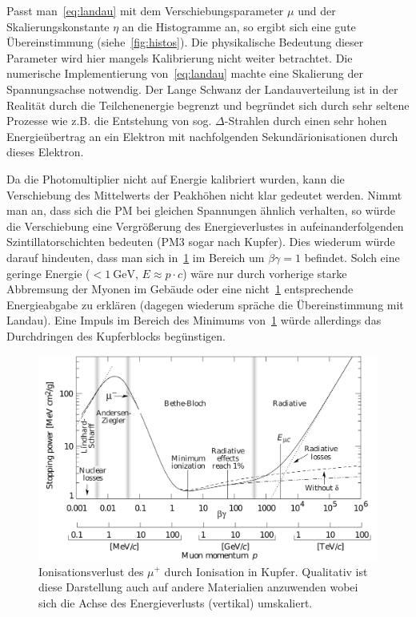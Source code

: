 \documentclass[slug=LM, room=Andreas-Schubert-Bau\,\ K\ 1A, supervisor=Anne-Sophie\ Berthold, coursedate=13.\ 12.\ 2019]{../../Lab_Report_LaTeX/lab_report}
\begin{document}
Passt man~\ref{eq:landau} mit dem Verschiebungsparameter \(\mu\) und
der Skalierungskonstante \(\eta\) an die Histogramme an, so ergibt
sich eine gute Übereinstimmung (siehe~\ref{fig:histos}). Die
physikalische Bedeutung dieser Parameter wird hier mangels
Kalibrierung nicht weiter betrachtet. Die numerische Implementierung
von~\ref{eq:landau} machte eine Skalierung der Spannungsachse
notwendig. Der Lange Schwanz der Landauverteilung ist in der
Realit\"at durch die Teilchenenergie begrenzt und begr\"undet sich
durch sehr seltene Prozesse wie z.B. die Entstehung von
sog. \(\Delta\)-Strahlen durch einen sehr hohen Energie\"ubertrag
an ein Elektron mit nachfolgenden Sekund\"arionisationen durch dieses
Elektron.

Da die Photomultiplier nicht auf Energie kalibriert wurden, kann die
Verschiebung des Mittelwerts der Peakh\"ohen nicht klar gedeutet
werden. Nimmt man an, dass sich die PM bei gleichen Spannungen
\"ahnlich verhalten, so w\"urde die Verschiebung eine
Vergr\"o\ss{}erung des Energieverlustes in aufeinanderfolgenden
Szintillatorschichten bedeuten (PM3 sogar nach Kupfer). Dies wiederum
w\"urde darauf hindeuten, dass man sich in~\ref{fig:muonbbloch} im
Bereich um \(\beta\gamma = 1\) befindet. Solch eine geringe Energie
(\(<\SI{1}{\giga\electronvolt}\), \(E\approx p\cdot c\)) w\"are nur
durch vorherige starke Abbremsung der Myonen im Geb\"aude
oder eine nicht~\ref{fig:muonbbloch} entsprechende
Energieabgabe zu erkl\"aren (dagegen wiederum spr\"ache die
\"Ubereinstimmung mit Landau). Eine Impuls im Bereich des Minimums
von~\ref{fig:muonbbloch} w\"urde allerdings das Durchdringen des
Kupferblocks beg\"unstigen.

\begin{figure}[H]\centering
  \includegraphics[width=\columnwidth]{./muon_stopp.png}
  \caption[Ionisationsverlust des \(\mu^{+}\)]{Ionisationsverlust des
    \(\mu^{+}\) durch Ionisation in
    Kupfer\cite{GROOM2001183}. Qualitativ ist diese Darstellung auch
    auf andere Materialien anzuwenden wobei sich die Achse des
    Energieverlusts (vertikal) umskaliert.}
  \label{fig:muonbbloch}
\end{figure}
\end{document}
